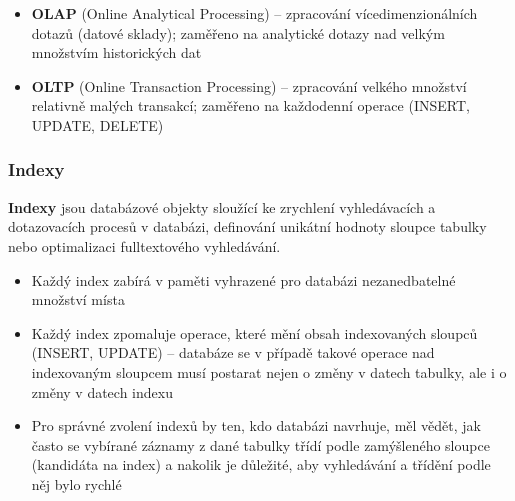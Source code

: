 \documentclass[12pt,a4paper]{article}
\begin{document}
\begin{itemize}
  \item \textbf{OLAP} (Online Analytical Processing) -- zpracování vícedimenzionálních dotazů
    (datové sklady); zaměřeno na analytické dotazy nad velkým množstvím historických dat
  \item \textbf{OLTP} (Online Transaction Processing) -- zpracování velkého množství relativně
    malých transakcí; zaměřeno na každodenní operace (INSERT, UPDATE, DELETE)
\end{itemize}

\subsubsection{Indexy}

\textbf{Indexy} jsou databázové objekty sloužící ke zrychlení vyhledávacích a dotazovacích procesů
v databázi, definování unikátní hodnoty sloupce tabulky nebo optimalizaci fulltextového vyhledávání.

\begin{itemize}
  \item Každý index zabírá v paměti vyhrazené pro databázi nezanedbatelné množství místa
  \item Každý index zpomaluje operace, které mění obsah indexovaných sloupců (INSERT, UPDATE) --
    databáze se v případě takové operace nad indexovaným sloupcem musí postarat nejen o změny
    v datech tabulky, ale i o změny v datech indexu
  \item Pro správné zvolení indexů by ten, kdo databázi navrhuje, měl vědět, jak často se vybírané
    záznamy z dané tabulky třídí podle zamýšleného sloupce (kandidáta na index) a nakolik je
    důležité, aby vyhledávání a třídění podle něj bylo rychlé
\end{itemize}
\end{document}
